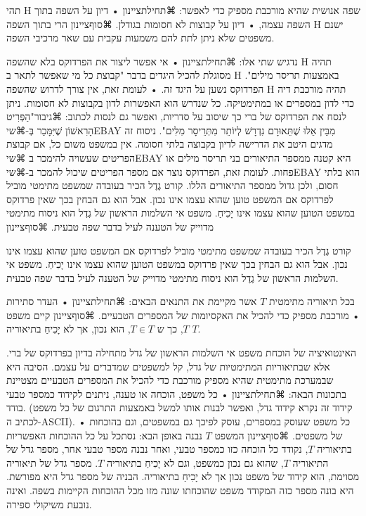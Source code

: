 {\begin{mybox}
תהי H שפה אנושית שהיא מורכבת מספיק כדי לאפשר:
⌘תחילת{ציינון}
• דיון על השפה בתוך השפה עצמה, 
• דיון על קבוצות לא חסומות בגודלן.
⌘סוף{ציינון}
הרי בתוך השפה H ישנם משפטים שלא ניתן לתת להם משמעות עקבית עם שאר מרכיבי השפה. 
\end{mybox}


נדגיש שתי אלו: 
⌘תחילת{ציינון}
• אי אפשר ליצור את הפרדוקס בלא שהשפה H תהיה מסוגלת להכיל היגדים בדבר "קבוצת כל מי שאפשר לתאר ב H באמצעות תריסר מילים". הפרדוקס נשען על היגד זה.
• לעומת זאת, אין צורך לדרוש שהשפה H תהיה מורכבת דיה כדי לדון במספרים או במתימטיקה. כל שנדרש הוא האפשרות לדון בקבוצות לא חסומות. ניתן לנסח את הפרדוקס של ברי כך שיסוב על סדריות, ואפשר גם לנסות לכתוב:  ⌘גיבור{"הַפְּרִיט הָרִאשׁוֹן שֶׁיִּמָּכֵר בְּ-⌘שי{EBAY} מִבֵּין אֵלּוּ שֶׁתֵּאוּרָם נִדְרָשׁ לְיוֹתֵר מִתְּרֵיסָר מִלִּים"}. ניסוח זה מדגים היטב את הדרישה לדיון בקבוצה בלתי חסומה. אין במשפט משום כל, אם קבוצת הפריטים שעשויה להימכר ב ⌘שי{EBAY} היא קטנה ממספר התיאורים בני תריסר מילים או פחות. לעומת זאת, הפרדוקס נוצר אם מספר הפריטים שיכול להמכר ב-⌘שי{EBAY} הוא בלתי חסום, ולכן גדול ממספר התיאורים הללו. 
קורט גֶדֶל הכיר בעובדה שמשפט מתימטי מוביל לפרדוקס אם המשפט טוען שהוא עצמו אינו נכון. אבל הוא גם הבחין בכך שאין פרדוקס במשפט הטוען שהוא עצמו אינו יָכִיחַ. משפט אי השלמות הראשון של גֶדֶל הוא ניסוח מתימטי מדוייק של הטענה לעיל בדבר שפה טבעית.
⌘סוף{ציינון}

קורט גֶדֶל הכיר בעובדה שמשפט מתימטי מוביל לפרדוקס אם המשפט טוען שהוא עצמו אינו נכון. אבל הוא גם הבחין בכך שאין פרדוקס במשפט הטוען שהוא עצמו אינו יָכִיחַ. משפט אי השלמות הראשון של גֶדֶל הוא ניסוח מתימטי מדוייק של הטענה לעיל בדבר שפה טבעית.


\begin{mybox}
בכל תיאוריה מתימטית $ T $ אשר מקיימת את התנאים הבאים:
⌘תחילת{ציינון}
• העדר סתירות 
• מורכבת מספיק כדי להכיל את האקסיומות של המספרים הטבעיים.
⌘סוף{ציינון}
קיים משפט $ T $,  כך ש $ T \in T $, הוא נכון, אך לא יָכִיחַ בתיאוריה $ T $.
\end{mybox}
האינטואיציה של הוכחת משפט אי השלמות הראשון של גדל מתחילה בדיון בפרדוקס של ברי. אלא שבתיאוריות המתימטיות של גדל, קל למשפטים שמדברים על עצמם. הסיבה היא שבמערכת מתימטית שהיא מספיק מורכבת כדי להכיל את המספרים הטבעיים מצטיינת בתכונות הבאה:
⌘תחילת{ציינון}
• כל משפט, הוכחה או טענה, ניתנים לקידוד כמספר טבעי בודד. (קידוד זה נקרא קידוד גדל, ואפשר לבנות אותו למשל באמצעות התרגום של כל משפט לכתיב ה-ASCII).
• כל משפט שעוסק במספרים, עוסק לפיכך גם במשפטים, וגם בהוכחות של משפטים.
⌘סוף{ציינון}
 המשפט $ T $ נבנה באופן הבא: נסתכל על כל ההוכחות האפשריות בתיאוריה $ T $, נקודד כל הוכחה כזו כמספר טבעי, ואחר נבנה מספר טבעי אחר, מספר גדל של התיאוריה $ T $, שהוא גם נכון כמשפט, וגם לא      יָכִיחַ בתיאוריה $ T $. מספר גדל של תיאוריה מסוימת, הוא קידוד של משפט נכון אך לא יָכִיחַ בתיאוריה. הבניה של מספר גדל היא מפורשת. היא בונה מספר כזה המקודד משפט שהוכחתו שונה מזו מכל ההוכחות הקיימות בשפה. ואינה נובעת משיקולי ספירה.

}
